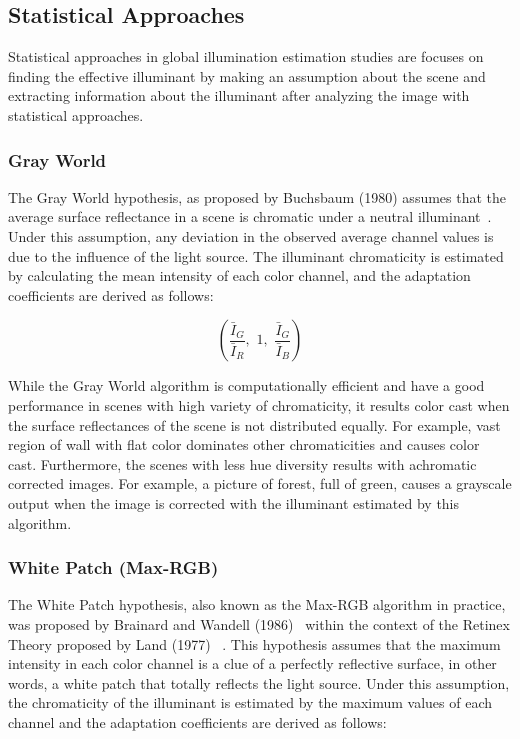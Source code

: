 \subsection{Statistical Approaches}
\label{sec:statistical_approaches}

Statistical approaches in global illumination estimation studies are focuses on finding the effective illuminant by making an assumption about the scene and extracting information about the illuminant after analyzing the image with statistical approaches.

\subsubsection{Gray World}
\label{algorithm:gray_world}
The Gray World hypothesis, as proposed by Buchsbaum (1980) assumes that the average surface reflectance in a scene is chromatic under a neutral illuminant~\cite{gray_world}. Under this assumption, any deviation in the observed average channel values is due to the influence of the light source. The illuminant chromaticity is estimated by calculating the mean intensity of each color channel, and the adaptation coefficients are derived as follows:

\[
\left( \frac{\bar{I}_G}{\bar{I}_R}, \,\, 1, \,\, \frac{\bar{I}_G}{\bar{I}_B} \right)
\]

While the Gray World algorithm is computationally efficient and have a good performance in scenes with high variety of chromaticity, it results color cast when the surface reflectances of the scene is not distributed equally. For example, vast region of wall with flat color dominates other chromaticities and causes color cast. Furthermore, the scenes with less hue diversity results with achromatic corrected images. For example, a picture of forest, full of green, causes a grayscale output when the image is corrected with the illuminant estimated by this algorithm.

\subsubsection{White Patch (Max-RGB)}
\label{algorithm:white_patch}
The White Patch hypothesis, also known as the Max-RGB algorithm in practice, was proposed by Brainard and Wandell (1986)~\cite{white_patch} within the context of the Retinex Theory proposed by Land (1977) ~\cite{retinex}. This hypothesis assumes that the maximum intensity in each color channel is a clue of a perfectly reflective surface, in other words, a white patch that totally reflects the light source. Under this assumption, the chromaticity of the illuminant is estimated by the maximum values of each channel and the adaptation coefficients are derived as follows:

